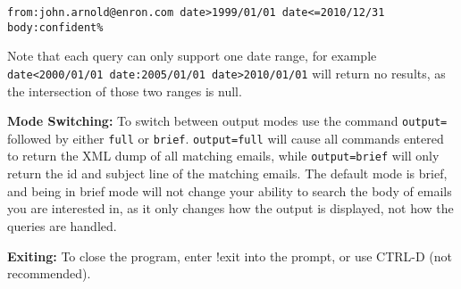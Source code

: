 \verb|from:john.arnold@enron.com date>1999/01/01 date<=2010/12/31 body:confident%|

Note that each query can only support one date range, for example 
\verb|date<2000/01/01 date:2005/01/01 date>2010/01/01| will return no results, as the 
intersection of those two ranges is null.

\textbf{Mode Switching: }
To switch between output modes use the command \verb|output=| followed by either \verb|full| or 
\verb|brief|.  \verb|output=full| will cause all commands entered to return the XML dump of all 
matching emails, while \verb|output=brief| will only return the id and subject line of the matching 
emails.  The default mode is brief, and being in brief mode will not change your ability to search 
the body of emails you are interested in, as it only changes how the output is displayed, not how 
the queries are handled. 

\textbf{Exiting: }
To close the program, enter !exit into the prompt, or use CTRL-D (not recommended).   
